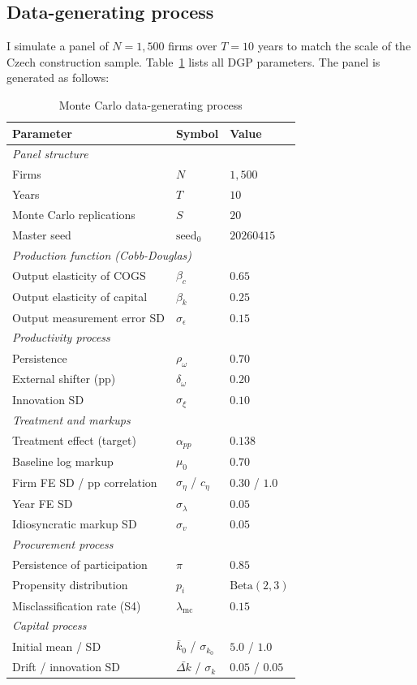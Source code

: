 \documentclass[11pt]{article}
\begin{document}
\subsection{Data-generating process}\label{sec:mc_dgp}

I simulate a panel of $N = 1{,}500$ firms over $T = 10$ years to match the scale of the Czech construction sample. Table~\ref{tab:mc_dgp} lists all DGP parameters. The panel is generated as follows:

\begin{table}[htbp]
\centering
\caption{Monte Carlo data-generating process}\label{tab:mc_dgp}
\small
\begin{tabular}{lll}
\toprule
Parameter & Symbol & Value \\
\midrule
\multicolumn{3}{l}{\textit{Panel structure}} \\
Firms & $N$ & $1{,}500$ \\
Years & $T$ & $10$ \\
Monte Carlo replications & $S$ & $20$ \\
Master seed & $\text{seed}_0$ & $20260415$ \\[2pt]
\multicolumn{3}{l}{\textit{Production function (Cobb-Douglas)}} \\
Output elasticity of COGS & $\beta_c$ & $0.65$ \\
Output elasticity of capital & $\beta_k$ & $0.25$ \\
Output measurement error SD & $\sigma_\epsilon$ & $0.15$ \\[2pt]
\multicolumn{3}{l}{\textit{Productivity process}} \\
Persistence & $\rho_\omega$ & $0.70$ \\
External shifter (pp) & $\delta_\omega$ & $0.20$ \\
Innovation SD & $\sigma_\xi$ & $0.10$ \\[2pt]
\multicolumn{3}{l}{\textit{Treatment and markups}} \\
Treatment effect (target) & $\alpha_{pp}$ & $0.138$ \\
Baseline log markup & $\mu_0$ & $0.70$ \\
Firm FE SD / pp correlation & $\sigma_\eta$ / $c_\eta$ & $0.30$ / $1.0$ \\
Year FE SD & $\sigma_\lambda$ & $0.05$ \\
Idiosyncratic markup SD & $\sigma_v$ & $0.05$ \\[2pt]
\multicolumn{3}{l}{\textit{Procurement process}} \\
Persistence of participation & $\pi$ & $0.85$ \\
Propensity distribution & $p_i$ & $\mathrm{Beta}(2,3)$ \\
Misclassification rate (S4) & $\lambda_\text{mc}$ & $0.15$ \\[2pt]
\multicolumn{3}{l}{\textit{Capital process}} \\
Initial mean / SD & $\bar k_0$ / $\sigma_{k_0}$ & $5.0$ / $1.0$ \\
Drift / innovation SD & $\bar{\Delta k}$ / $\sigma_k$ & $0.05$ / $0.05$ \\
\bottomrule
\end{tabular}
\end{table}
\end{document}
